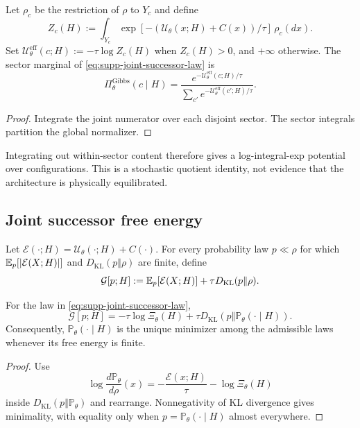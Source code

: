 \begin{proposition}\label{prop:supp-effective-sector-potential}
Let $\rho_c$ be the restriction of $\rho$ to $Y_c$ and define
\[
Z_c(H)
:=
\int_{Y_c}
\exp[-(\mathcal U_\theta(x;H)+C(x))/\tau] \,\rho_c(dx).
\]
Set $\mathcal U_\theta^{\mathrm{eff}}(c;H):=-\tau\log Z_c(H)$ when $Z_c(H)>0$, and $+\infty$ otherwise. The sector marginal of \eqref{eq:supp-joint-successor-law} is
\[
\Pi_\theta^{\mathrm{Gibbs}}(c\mid H)
=
\frac{e^{-\mathcal U_\theta^{\mathrm{eff}}(c;H)/\tau}}
{\sum_{c'}e^{-\mathcal U_\theta^{\mathrm{eff}}(c';H)/\tau}}.
\]
\end{proposition}

\begin{proof}
Integrate the joint numerator over each disjoint sector. The sector integrals partition the global normalizer.
\end{proof}

Integrating out within-sector content therefore gives a log-integral-exp potential over configurations. This is a stochastic quotient identity, not evidence that the architecture is physically equilibrated.

\subsection{Joint successor free energy}

Let $\mathcal E(\cdot;H)=\mathcal U_\theta(\cdot;H)+C(\cdot)$. For every probability law $p\ll\rho$ for which $\mathbb{E}_p[|\mathcal E(X;H)|]$ and $D_{\mathrm{KL}}(p\Vert\rho)$ are finite, define
\[
\mathcal G[p;H]
:=\mathbb{E}_p[\mathcal E(X;H)]+\tau D_{\mathrm{KL}}(p\Vert\rho).
\]

\begin{theorem}\label{thm:supp-joint-successor-free-energy}
For the law in \eqref{eq:supp-joint-successor-law},
\[
\mathcal G[p;H]
=-\tau\log\Xi_\theta(H)
+\tau D_{\mathrm{KL}}(p\Vert\mathbb P_\theta(\cdot\mid H)).
\]
Consequently, $\mathbb P_\theta(\cdot\mid H)$ is the unique minimizer among the admissible laws whenever its free energy is finite.
\end{theorem}

\begin{proof}
Use
\[
\log\frac{d\mathbb P_\theta}{d\rho}(x)
=-\frac{\mathcal E(x;H)}{\tau}-\log\Xi_\theta(H)
\]
inside $D_{\mathrm{KL}}(p\Vert\mathbb P_\theta)$ and rearrange. Nonnegativity of KL divergence gives minimality, with equality only when $p=\mathbb P_\theta(\cdot\mid H)$ almost everywhere.
\end{proof}

